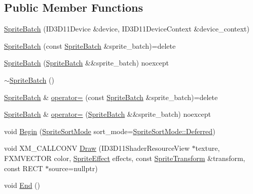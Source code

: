 \subsection*{Public Member Functions}
\begin{DoxyCompactItemize}
\item 
\hyperlink{classmage_1_1rendering_1_1_sprite_batch_a44e4cca2560beccf655c87d79dca3d20}{Sprite\+Batch} (I\+D3\+D11\+Device \&device, I\+D3\+D11\+Device\+Context \&device\+\_\+context)
\item 
\hyperlink{classmage_1_1rendering_1_1_sprite_batch_a979cdc21ce17579ded4066f1e6a2d411}{Sprite\+Batch} (const \hyperlink{classmage_1_1rendering_1_1_sprite_batch}{Sprite\+Batch} \&sprite\+\_\+batch)=delete
\item 
\hyperlink{classmage_1_1rendering_1_1_sprite_batch_a91644c1c0c3e53a87f470116ec9746dc}{Sprite\+Batch} (\hyperlink{classmage_1_1rendering_1_1_sprite_batch}{Sprite\+Batch} \&\&sprite\+\_\+batch) noexcept
\item 
\hyperlink{classmage_1_1rendering_1_1_sprite_batch_aedb2831f0054cedb1ede8be8f27e0432}{$\sim$\+Sprite\+Batch} ()
\item 
\hyperlink{classmage_1_1rendering_1_1_sprite_batch}{Sprite\+Batch} \& \hyperlink{classmage_1_1rendering_1_1_sprite_batch_a336c16ed2eee2ef9fe8520903033f63e}{operator=} (const \hyperlink{classmage_1_1rendering_1_1_sprite_batch}{Sprite\+Batch} \&sprite\+\_\+batch)=delete
\item 
\hyperlink{classmage_1_1rendering_1_1_sprite_batch}{Sprite\+Batch} \& \hyperlink{classmage_1_1rendering_1_1_sprite_batch_ae5de43894a07d86a0d2e4150080a7990}{operator=} (\hyperlink{classmage_1_1rendering_1_1_sprite_batch}{Sprite\+Batch} \&\&sprite\+\_\+batch) noexcept
\item 
void \hyperlink{classmage_1_1rendering_1_1_sprite_batch_ae90ef53946738b7933ee69004dbbe63c}{Begin} (\hyperlink{namespacemage_1_1rendering_a4fad00dbca0c8d854c765ab831c76055}{Sprite\+Sort\+Mode} sort\+\_\+mode=\hyperlink{namespacemage_1_1rendering_aeb14ce7610cc9391f4e01be027b91dcca4ed71db54748b36eeb398876b0c747ac}{Sprite\+Sort\+Mode\+::\+Deferred})
\item 
void X\+M\+\_\+\+C\+A\+L\+L\+C\+O\+NV \hyperlink{classmage_1_1rendering_1_1_sprite_batch_ae74068fb6f2bcc084a810a12c2eb478c}{Draw} (I\+D3\+D11\+Shader\+Resource\+View $\ast$texture, F\+X\+M\+V\+E\+C\+T\+OR color, \hyperlink{namespacemage_1_1rendering_a4dbc3536c87b906f1d41d863ec458e78}{Sprite\+Effect} effects, const \hyperlink{classmage_1_1_sprite_transform}{Sprite\+Transform} \&transform, const R\+E\+CT $\ast$source=nullptr)
\item 
void \hyperlink{classmage_1_1rendering_1_1_sprite_batch_ac27b9692f118361853c94af91b3d4d2d}{End} ()
\end{DoxyCompactItemize}
